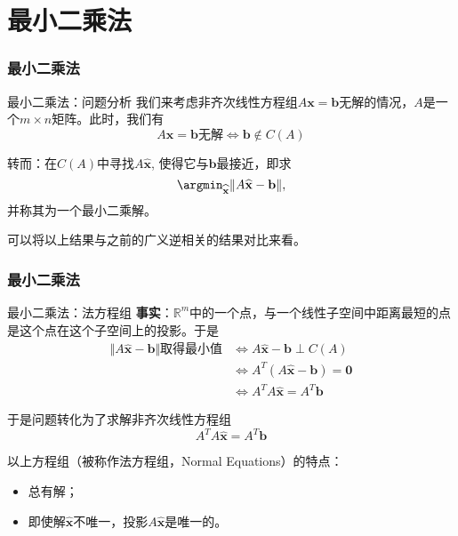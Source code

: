 
\section{最小二乘法}


\begin{frame}
\frametitle{最小二乘法}

\begin{block}{最小二乘法：问题分析}
我们来考虑非齐次线性方程组$A\mathbf{x} = \mathbf{b}$无解的情况，$A$是一个$m\times n$矩阵。此时，我们有
$$A\mathbf{x} = \mathbf{b}\text{无解} \Longleftrightarrow \mathbf{b}\not\in C(A)$$

转而：在$C(A)$中寻找$A\widehat{\mathbf{x}}$, 使得它与$\mathbf{b}$最接近，即求
$$\argmin_{\widehat{\mathbf{x}}}\Vert A\widehat{\mathbf{x}} - \mathbf{b} \Vert,$$
并称其为一个最小二乘解。

\vspace{2em}
可以将以上结果与之前的广义逆相关的结果对比来看。
\end{block}

\end{frame}


\begin{frame}
\frametitle{最小二乘法}

\begin{block}{最小二乘法：法方程组}
{\bfseries 事实}：$\mathbb{R}^m$中的一个点，与一个线性子空间中距离最短的点是这个点在这个子空间上的投影。于是
\begin{align*}
\Vert A\widehat{\mathbf{x}} - \mathbf{b} \Vert \text{取得最小值} & \Longleftrightarrow A\widehat{\mathbf{x}} - \mathbf{b} \perp C(A) \\
& \Longleftrightarrow A^T (A\widehat{\mathbf{x}} - \mathbf{b}) = \mathbf{0} \\
& \Longleftrightarrow A^TA\widehat{\mathbf{x}} = A^T\mathbf{b}
\end{align*}

于是问题转化为了求解非齐次线性方程组
$$A^TA\widehat{\mathbf{x}} = A^T\mathbf{b}$$

\vspace{1em}
\pause

以上方程组（被称作法方程组，Normal Equations）的特点：
\begin{itemize}
\item 总有解；
\item 即使解$\widehat{\mathbf{x}}$不唯一，投影$A\widehat{\mathbf{x}}$是唯一的。
\end{itemize}
\end{block}

\end{frame}

